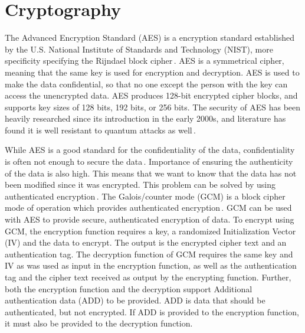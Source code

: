 \section{Cryptography}
\label{sec:back_crypto}
The Advanced Encryption Standard (\gls{AES}) is a encryption standard established by the U.S. National Institute of Standards and Technology (\gls{NIST}), more specificity specifying the Rijndael block cipher\,\cite{kumarvermaPerformanceAnalysisRC62012}. AES is a symmetrical cipher, meaning that the same key is used for encryption and decryption. AES is used to make the data confidential, so that no one except the person with the key can access the unencrypted data. AES produces 128-bit encrypted cipher blocks, and supports key sizes of 128 bits, 192 bits, or 256 bits. The security of AES has been heavily researched since its introduction in the early 2000s, and literature has found it is well resistant to quantum attacks as well\,\cite{bonnetainQuantumSecurityAnalysis2019}.

While AES is a good standard for the confidentiality of the data, confidentiality is often not enough to secure the data\,\cite{rosswallrabensteinWhenItComes2021}. Importance of ensuring the authenticity of the data is also high. This means that we want to know that the data has not been modified since it was encrypted. This problem can be solved by using authenticated encryption\,\cite{khovratovichAnswerWhyShould2013}. The Galois/counter mode (\gls{GCM}) is a block cipher mode of operation which provides authenticated encryption\,\cite{mcgrewGaloisCounterMode2004}. GCM can be used with AES to provide secure, authenticated encryption of data. To encrypt using GCM, the encryption function requires a key, a randomized Initialization Vector (\gls{IV}) and the data to encrypt. The output is the encrypted cipher text and an authentication tag. The decryption function of GCM requires the same key and IV as was used as input in the encryption function, as well as the authentication tag and the cipher text received as output by the encrypting function. Further, both the encryption function and the decryption support Additional authentication data (\gls{ADD}) to be provided. ADD is data that should be authenticated, but not encrypted. If ADD is provided to the encryption function, it must also be provided to the decryption function.

